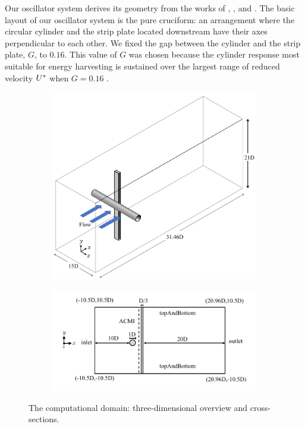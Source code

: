 \documentclass[oneside]{utmthesis}
\begin{document}
Our oscillator system derives its geometry from the works of \citet{Nguyen2012}, \citet{Koide2013}, and \citet{Koide2017}. The basic layout of our oscillator system is the pure cruciform: an arrangement where the circular cylinder and the strip plate located downstream have their axes perpendicular to each other. We fixed the gap between the cylinder and the strip plate, $G$, to $0.16$. This value of $G$ was chosen because the cylinder response most suitable for energy harvesting is sustained over the largest range of reduced velocity $U^{*}$ when $G = 0.16$ \citep{Koide2013}.

\begin{figure}
  \centering
  \begin{subfigure}[h]{0.95\textwidth}
    \includegraphics[width=\textwidth]{figs/threeDimensionalDomain}
    \caption{}
    \label{fig:threeDimDom}
  \end{subfigure}

  \begin{subfigure}[h]{1\textwidth}
    \includegraphics[width=\textwidth]{figs/problemGeometrySide}
    \caption{}
    \label{fig:probGeoSide}
  \end{subfigure}

  \caption{The computational domain: three-dimensional overview and cross-sections.}
\end{figure}
\end{document}

